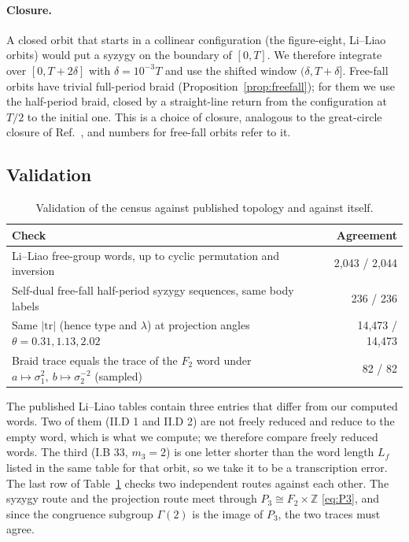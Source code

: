 \documentclass[11pt]{article}
\theoremstyle{remark}
\newcommand{\Z}{\mathbb{Z}}
\begin{document}
\paragraph{Closure.} A closed orbit that starts in a collinear configuration (the figure-eight, Li--Liao
orbits) would put a syzygy on the boundary of $[0,T]$. We therefore integrate over $[0,T+2\delta]$ with
$\delta=10^{-3}T$ and use the shifted window $(\delta,T+\delta]$. Free-fall orbits have trivial full-period
braid (Proposition~\ref{prop:freefall}); for them we use the half-period braid, closed by a straight-line return
from the configuration at $T/2$ to the initial one. This is a choice of closure, analogous to the great-circle
closure of Ref.~\cite{Hristov2024}, and numbers for free-fall orbits refer to it.

\subsection{Validation}

\begin{table}[h]
\centering
\begin{tabular}{@{}lr@{}}
\toprule
Check & Agreement\\
\midrule
Li--Liao free-group words, up to cyclic permutation and inversion \cite{LiLiao2017,LiJingLiao2018} & 2{,}043 / 2{,}044\\
Self-dual free-fall half-period syzygy sequences, same body labels \cite{Hristov2024} & 236 / 236\\
Same $|\mathrm{tr}|$ (hence type and $\lambda$) at projection angles $\theta=0.31,1.13,2.02$ & 14{,}473 / 14{,}473\\
Braid trace equals the trace of the $F_2$ word under $a\mapsto\sigma_1^2,\ b\mapsto\sigma_2^{-2}$ (sampled) & 82 / 82\\
\bottomrule
\end{tabular}
\caption{Validation of the census against published topology and against itself.}
\label{tab:validation}
\end{table}

The published Li--Liao tables contain three entries that differ from our computed words. Two of them (II.D 1
and II.D 2) are not freely reduced and reduce to the empty word, which is what we compute; we therefore compare
freely reduced words. The third (I.B 33, $m_3=2$) is one letter shorter than the word length $L_f$ listed in the
same table for that orbit, so we take it to be a transcription error. The last row of Table~\ref{tab:validation}
checks two independent routes against each other. The syzygy route and the projection route meet through
$P_3\cong F_2\times\Z$ \eqref{eq:P3}, and since the congruence subgroup $\Gamma(2)$ is the image of $P_3$, the
two traces must agree.
\end{document}
